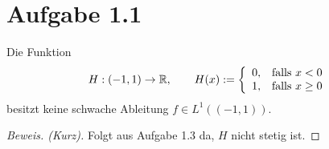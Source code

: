\documentclass[12pt,a4paper]{article}
\author{Willi Sontopski}
\begin{document}

\section*{Aufgabe 1.1}
Die Funktion
\begin{align*}
H:(-1,1)\to\mathbb{R},\qquad H(x):=\left\lbrace\begin{array}{cl}
0, & \text{falls } x<0\\
1, & \text{falls } x\geq0
\end{array}\right.
\end{align*}
besitzt keine schwache Ableitung $f\in L^1((-1,1))$.

\begin{proof}[Beweis. (Kurz)]
Folgt aus Aufgabe 1.3 da, $H$ nicht stetig ist.
\end{proof}
\end{document}
